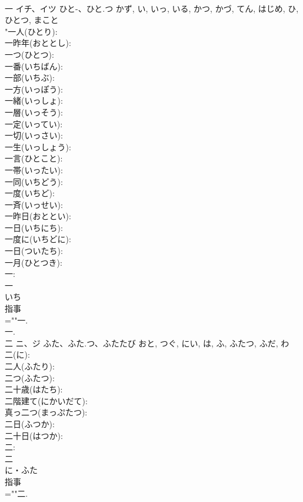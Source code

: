 \documentclass[8pt]{extreport}
\begin{document}
\begin{CJK}{UTF8}{min}
\\	一	イチ、イツ	ひと-、ひと.つ	かず, い, いっ, いる, かつ, かづ, てん, はじめ, ひ, ひとつ, まこと	
\\	"一人(ひとり): 
\\	一昨年(おととし): 
\\	一つ(ひとつ): 
\\	一番(いちばん): 
\\	一部(いちぶ): 
\\	一方(いっぽう): 
\\	一緒(いっしょ): 
\\	一層(いっそう): 
\\	一定(いってい): 
\\	一切(いっさい): 
\\	一生(いっしょう): 
\\	一言(ひとこと): 
\\	一帯(いったい): 
\\	一同(いちどう): 
\\	一度(いちど): 
\\	一斉(いっせい): 
\\	一昨日(おととい): 
\\	一日(いちにち): 
\\	一度に(いちどに): 
\\	一日(ついたち): 
\\	一月(ひとつき): 
\\	一: 
\\	一	
\\	いち	
\\	指事 
\\	=""一.
\\	一.
\\	二	ニ、ジ	ふた、ふた.つ、ふたたび	おと, つぐ, にい, は, ふ, ふたつ, ふだ, わ	
\\	二(に): 
\\	二人(ふたり): 
\\	二つ(ふたつ): 
\\	二十歳(はたち): 
\\	二階建て(にかいだて): 
\\	真っ二つ(まっぷたつ): 
\\	二日(ふつか): 
\\	二十日(はつか): 
\\	二: 
\\	二	
\\	に・ふた	
\\	指事 
\\	=""二.

\end{CJK}
\end{document}
